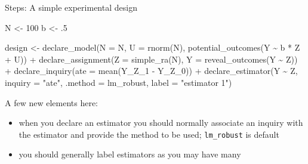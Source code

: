 \documentclass[
  11pt,
  ignorenonframetext,
]{beamer}
\newenvironment{Shaded}{\begin{snugshade}}{\end{snugshade}}
\newcommand{\AttributeTok}[1]{\textcolor[rgb]{0.40,0.45,0.13}{#1}}
\newcommand{\DecValTok}[1]{\textcolor[rgb]{0.68,0.00,0.00}{#1}}
\newcommand{\FunctionTok}[1]{\textcolor[rgb]{0.28,0.35,0.67}{#1}}
\newcommand{\NormalTok}[1]{\textcolor[rgb]{0.00,0.23,0.31}{#1}}
\newcommand{\OtherTok}[1]{\textcolor[rgb]{0.00,0.23,0.31}{#1}}
\newcommand{\SpecialCharTok}[1]{\textcolor[rgb]{0.37,0.37,0.37}{#1}}
\newcommand{\StringTok}[1]{\textcolor[rgb]{0.13,0.47,0.30}{#1}}
\providecommand{\tightlist}{%
  \setlength{\itemsep}{0pt}\setlength{\parskip}{0pt}}\usepackage{longtable,booktabs,array}
\begin{document}
\begin{frame}[fragile]{Steps: A simple experimental design}
\protect\hypertarget{steps-a-simple-experimental-design-1}{}
\begin{Shaded}
\begin{Highlighting}[]
\NormalTok{N }\OtherTok{\textless{}{-}} \DecValTok{100}
\NormalTok{b }\OtherTok{\textless{}{-}}\NormalTok{ .}\DecValTok{5}

\NormalTok{design }\OtherTok{\textless{}{-}} 
  \FunctionTok{declare\_model}\NormalTok{(}\AttributeTok{N =}\NormalTok{ N, }\AttributeTok{U =} \FunctionTok{rnorm}\NormalTok{(N), }
                \FunctionTok{potential\_outcomes}\NormalTok{(Y }\SpecialCharTok{\textasciitilde{}}\NormalTok{ b }\SpecialCharTok{*}\NormalTok{ Z }\SpecialCharTok{+}\NormalTok{ U)) }\SpecialCharTok{+} 
  \FunctionTok{declare\_assignment}\NormalTok{(}\AttributeTok{Z =} \FunctionTok{simple\_ra}\NormalTok{(N), }\AttributeTok{Y =} \FunctionTok{reveal\_outcomes}\NormalTok{(Y }\SpecialCharTok{\textasciitilde{}}\NormalTok{ Z)) }\SpecialCharTok{+} 
  \FunctionTok{declare\_inquiry}\NormalTok{(}\AttributeTok{ate =} \FunctionTok{mean}\NormalTok{(Y\_Z\_1 }\SpecialCharTok{{-}}\NormalTok{ Y\_Z\_0)) }\SpecialCharTok{+} 
  \FunctionTok{declare\_estimator}\NormalTok{(Y }\SpecialCharTok{\textasciitilde{}}\NormalTok{ Z, }\AttributeTok{inquiry =} \StringTok{"ate"}\NormalTok{, }\AttributeTok{.method =}\NormalTok{ lm\_robust, }\AttributeTok{label =} \StringTok{"estimator 1"}\NormalTok{)}
\end{Highlighting}
\end{Shaded}

A few new elements here:

\begin{itemize}
\tightlist
\item
  when you declare an estimator you should normally associate an inquiry
  with the estimator and provide the method to be used;
  \texttt{lm\_robust} is default
\item
  you should generally label estimators as you may have many
\end{itemize}
\end{frame}
\end{document}
